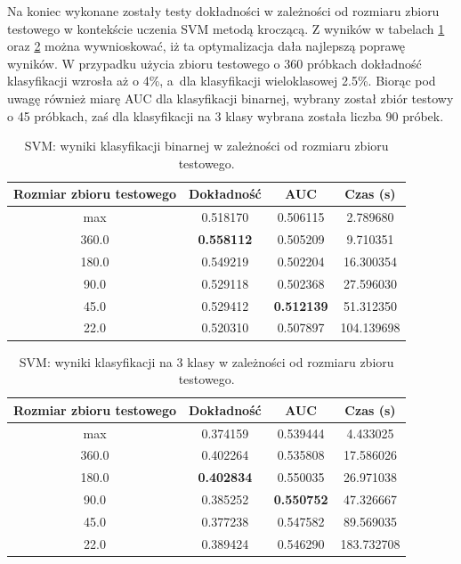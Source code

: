 \documentclass[a4paper, twoside, 11pt, openright]{article}
\begin{document}
Na koniec wykonane zostały testy dokładności w zależności od rozmiaru zbioru testowego w kontekście uczenia SVM metodą kroczącą. Z wyników w tabelach \ref{tab:svm_walk_forward_binary} oraz \ref{tab:svm_walk_forward_discrete} można wywnioskować, iż ta optymalizacja dała najlepszą poprawę wyników. W przypadku użycia zbioru testowego o 360 próbkach dokładność klasyfikacji wzrosła aż o 4\%, a~dla klasyfikacji wieloklasowej 2.5\%. Biorąc pod uwagę również miarę AUC dla klasyfikacji binarnej, wybrany został zbiór testowy o 45 próbkach, zaś dla klasyfikacji na 3 klasy wybrana została liczba 90 próbek.


\begin{table}[H]
    \centering
    \begin{tabular}{|c|c|c|c|}
    \hline
        \textbf{Rozmiar zbioru testowego} & \textbf{Dokładność} & \textbf{AUC} & \textbf{Czas (s)} \\ \hline
max                        &   0.518170 &  0.506115 &    2.789680 \\ \hline
360.0                         &  \textbf{0.558112} &  0.505209 &    9.710351 \\ \hline
180.0                         &  0.549219 &  0.502204 &   16.300354 \\ \hline
90.0                          &  0.529118 &  0.502368 &   27.596030 \\ \hline
45.0                          &  0.529412 &  \textbf{0.512139} &   51.312350 \\ \hline
22.0                          &  0.520310 &  0.507897 &  104.139698 \\ \hline

    \end{tabular}
    \caption{SVM: wyniki klasyfikacji binarnej w zależności od rozmiaru zbioru testowego.}
    \label{tab:svm_walk_forward_binary}
\end{table}



\begin{table}[H]
    \centering
    \begin{tabular}{|c|c|c|c|}
    \hline
        \textbf{Rozmiar zbioru testowego} & \textbf{Dokładność} & \textbf{AUC} & \textbf{Czas (s)} \\ \hline
max                       &  0.374159 &  0.539444 &    4.433025 \\ \hline
360.0                         &  0.402264 &  0.535808 &   17.586026 \\ \hline
180.0                         &  \textbf{0.402834} &  0.550035 &   26.971038 \\ \hline
90.0                          &  0.385252 &  \textbf{0.550752} &   47.326667 \\ \hline
45.0                          &  0.377238 &  0.547582 &   89.569035 \\ \hline
22.0                          &  0.389424 &  0.546290 &  183.732708 \\ \hline
    \end{tabular}
    \caption{SVM: wyniki klasyfikacji na 3 klasy w zależności od rozmiaru zbioru testowego.}
    \label{tab:svm_walk_forward_discrete}
\end{table}
    
\end{document}
